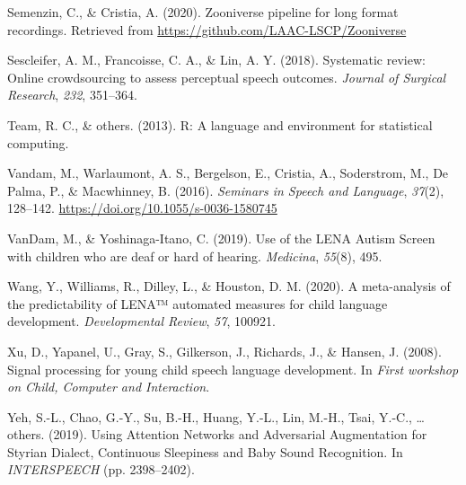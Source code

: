 \documentclass[english,,man]{apa6}
\begin{document}
\leavevmode\hypertarget{ref-semenzin2020zooniverse}{}%
Semenzin, C., \& Cristia, A. (2020). Zooniverse pipeline for long format recordings. Retrieved from \url{https://github.com/LAAC-LSCP/Zooniverse}

\leavevmode\hypertarget{ref-sescleifer2018systematic}{}%
Sescleifer, A. M., Francoisse, C. A., \& Lin, A. Y. (2018). Systematic review: Online crowdsourcing to assess perceptual speech outcomes. \emph{Journal of Surgical Research}, \emph{232}, 351--364.

\leavevmode\hypertarget{ref-team2013r}{}%
Team, R. C., \& others. (2013). R: A language and environment for statistical computing.

\leavevmode\hypertarget{ref-vandam2016homebank}{}%
Vandam, M., Warlaumont, A. S., Bergelson, E., Cristia, A., Soderstrom, M., De Palma, P., \& Macwhinney, B. (2016). \emph{Seminars in Speech and Language}, \emph{37}(2), 128--142. \url{https://doi.org/10.1055/s-0036-1580745}

\leavevmode\hypertarget{ref-vandam2019use}{}%
VanDam, M., \& Yoshinaga-Itano, C. (2019). Use of the LENA Autism Screen with children who are deaf or hard of hearing. \emph{Medicina}, \emph{55}(8), 495.

\leavevmode\hypertarget{ref-wang2020meta}{}%
Wang, Y., Williams, R., Dilley, L., \& Houston, D. M. (2020). A meta-analysis of the predictability of LENA™ automated measures for child language development. \emph{Developmental Review}, \emph{57}, 100921.

\leavevmode\hypertarget{ref-xu2008signal}{}%
Xu, D., Yapanel, U., Gray, S., Gilkerson, J., Richards, J., \& Hansen, J. (2008). Signal processing for young child speech language development. In \emph{First workshop on Child, Computer and Interaction}.

\leavevmode\hypertarget{ref-yeh2019using}{}%
Yeh, S.-L., Chao, G.-Y., Su, B.-H., Huang, Y.-L., Lin, M.-H., Tsai, Y.-C., \ldots{} others. (2019). Using Attention Networks and Adversarial Augmentation for Styrian Dialect, Continuous Sleepiness and Baby Sound Recognition. In \emph{INTERSPEECH} (pp. 2398--2402).

\clearpage
\renewcommand{\listfigurename}{Figure captions}
\end{document}
